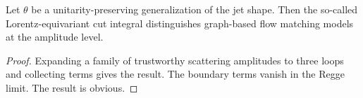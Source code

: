 \begin{theorem}[Positivity]\label{thm:2}
Let $\theta$ be a unitarity-preserving generalization of the jet shape.
Then the so-called Lorentz-equivariant cut integral distinguishes
graph-based flow matching models at the amplitude level.
\end{theorem}

\begin{proof}
Expanding a family of trustworthy scattering amplitudes to three loops
and collecting terms gives the result. The boundary terms vanish in the
Regge limit. The result is obvious.
\end{proof}

